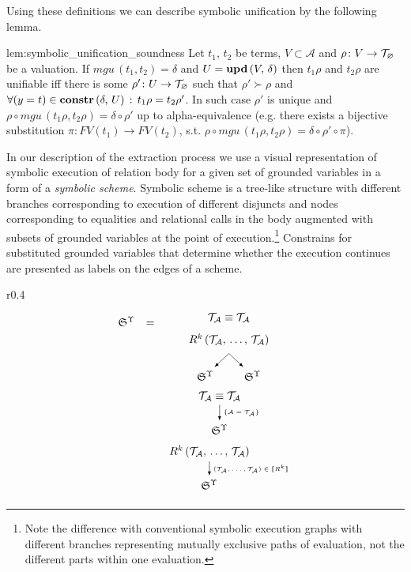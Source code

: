 Using these definitions we can describe symbolic unification by the following lemma.

\begin{replemma}{lem:symbolic_unification_soundness}
Let $t_1$, $t_2$ be terms,  $V \subset \mathcal{A}$ and $\rho \colon V \to \mathcal{T}_{\varnothing}$ be a valuation. If $mgu\,(t_1, t_2) = \delta$ and $U = \mbox{\textbf{upd}}\,(V,\, \delta) $  then $t_1 \rho$ and $t_2 \rho$ are unifiable iff there is some $\rho' \colon U \to \mathcal{T}_{\varnothing}$ such that $\rho' \succ \rho$ and $\forall (y = t) \in \mbox{\textbf{constr}}\,(\delta,\, U)\,:\, t_1 \rho = t_2 \rho'$.
In such case $\rho'$ is unique and $ \rho \circ mgu\,(t_1 \rho, t_2 \rho) = \delta\circ\rho' $ up to alpha-equivalence (e.g. there exists a bijective substitution $\pi : FV(t_1) \to FV(t_2)$, s.t. $ \rho \circ mgu\,(t_1 \rho, t_2 \rho) = \delta \circ\rho'\circ \pi$).
\end{replemma}

In our description of the extraction process we use a visual representation of symbolic execution of relation body for a given set of grounded variables in a form of a \emph{symbolic scheme}.
Symbolic scheme is a tree-like structure with different branches corresponding to execution of different disjuncts and nodes corresponding to equalities and relational calls in the body
augmented with subsets of grounded variables at the point of execution.\footnote{Note the difference with conventional symbolic execution graphs
with different branches representing mutually exclusive paths of evaluation, not the different parts within one evaluation.} Constrains for substituted
grounded variables that determine whether the execution continues are presented as labels on the edges of a scheme.

\begin{wrapfigure}{r}{0.4\textwidth}
\[\renewcommand{\arraystretch}{1}
\begin{array}{ccc}
  \schemewithvset{\mathfrak{S}}{\Upsilon} & = &\schemenode{$\unigoal{\mathcal{T}_\mathcal{A}}{\mathcal{T}_\mathcal{A}}$} \\
                                          &   &\schemenode{$\invokegoal{R^k}{\mathcal{T}_\mathcal{A}}{\mathcal{T}_\mathcal{A}}$} \\
                                          &   &\schemefork{$\schemewithvset{\mathfrak{S}}{\Upsilon}$}{$\schemewithvset{\mathfrak{S}}{\Upsilon}$} \\
                                          &   &\schemesarrow{$\unigoal{\mathcal{T}_\mathcal{A}}{\mathcal{T}_\mathcal{A}}$}{$\{\mathcal{A}=\mathcal{T}_\mathcal{A}\}$}{$\schemewithvset{\mathfrak{S}}{\Upsilon}$}\\
                                          &   &\schemedarrow{$\invokegoal{R^k}{\mathcal{T}_\mathcal{A}}{\mathcal{T}_\mathcal{A}}$}{$(\mathcal{T}_\mathcal{A}, \dots, \mathcal{T}_\mathcal{A}) \in \sembr{R^k}$}{$\schemewithvset{\mathfrak{S}}{\Upsilon}$} 
\end{array}\]
\caption{Symbolic Scheme Fragments}
\label{fig:scheme_fragments}
\end{wrapfigure}


